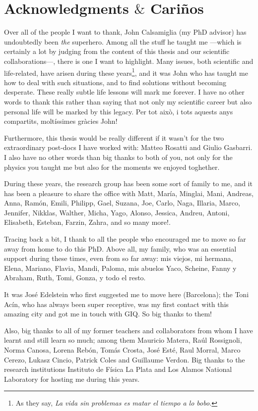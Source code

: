 \chapter*{Acknowledgments $\&$ Cariños}
Over all of the people I want to thank, John Calsamiglia (my PhD advisor) has undoubtedly been \textit{the} superhero. Among all the stuff he taught me ---which is certainly a lot by judging from the content of this thesis and our scientific collaborations---, there is one I want to highlight. Many issues, both scientific and life-related, have arisen during these years\footnote{As they say, \textit{La vida sin problemas es matar el tiempo a lo bobo.}}, and it was John who has taught me how to deal with such situations, and to find solutions without becoming desperate. These really subtle life lessons will mark me forever. I have no other words to thank this rather than saying that not only my scientific career but also personal life will be marked by this legacy. Per tot això, i tots aquests anys compartits, moltíssimes gràcies John!

Furthermore, this thesis would be really different if it wasn't for the two extraordinary post-docs I have worked with: Matteo Rosatti and Giulio Gasbarri. I also have no other words than big thanks to both of you, not only for the physics you taught me but also for the moments we enjoyed toghether.

During these years, the research group has been some sort of family to me, and it has been a pleasure to share the office with Matt, María, Minglai, Mani, Andreas, Anna, Ramón, Emili, Philipp, Gael, Suzana, Joe, Carlo, Naga, Illaria, Marco, Jennifer, Nikklas, Walther, Micha, Yago, Alonso, Jessica, Andreu, Antoni, Elisabeth, Esteban, Farzin, Zahra, and so many more!.

Tracing back a bit, I thank to all the people who encouraged me to move so far away from home to do this PhD. Above all, my family, who was an essential support during these times, even from so far away: mis viejos, mi hermana, Elena, Mariano, Flavia, Mandi, Paloma, mis abuelos Yaco, Scheine, Fanny y Abraham, Ruth, Tomi, Gonza, y todo el resto.

It was José Edelstein who first suggested me to move here (Barcelona); the Toni Acín, who has always been super receptive, was my first contact with this amazing city and got me in touch with GIQ. So big thanks to them!

Also, big thanks to all of my former teachers and collaborators from whom I have learnt and still learn so much; among them Mauricio Matera, Raúl Rossignoli, Norma Canosa, Lorena Rebón, Tomás Crosta, José Esté, Raul Morral, Marco Cerezo, Lukasz Cincio, Patrick Coles and Guillaume Verdon. Big thanks to the research institutions Instituto de Física La Plata and Los Alamos National Laboratory for hosting me during this years.

